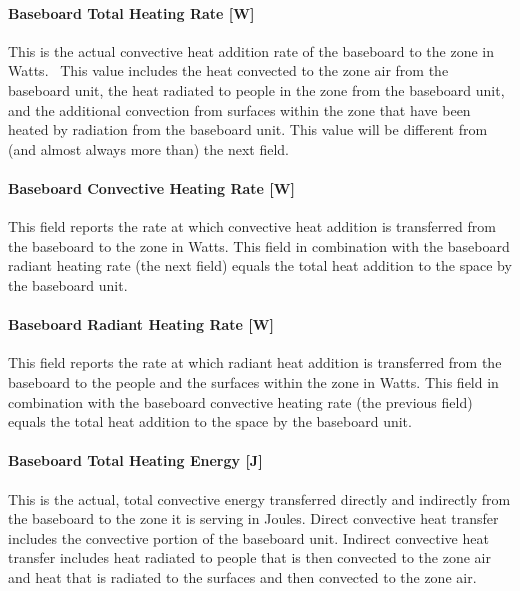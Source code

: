 \paragraph{Baseboard Total Heating Rate {[}W{]}}\label{baseboard-total-heating-rate-w-1}

This is the actual convective heat addition rate of the baseboard to the zone in Watts.~ This value includes the heat convected to the zone air from the baseboard unit, the heat radiated to people in the zone from the baseboard unit, and the additional convection from surfaces within the zone that have been heated by radiation from the baseboard unit. This value will be different from (and almost always more than) the next field.

\paragraph{Baseboard Convective Heating Rate {[}W{]}}\label{baseboard-convective-heating-rate-w-1}

This field reports the rate at which convective heat addition is transferred from the baseboard to the zone in Watts.  This field in combination with the baseboard radiant heating rate (the next field) equals the total heat addition to the space by the baseboard unit.

\paragraph{Baseboard Radiant Heating Rate {[}W{]}}\label{baseboard-radiant-heating-rate-w-1}

This field reports the rate at which radiant heat addition is transferred from the baseboard to the people and the surfaces within the zone in Watts.  This field in combination with the baseboard convective heating rate (the previous field) equals the total heat addition to the space by the baseboard unit.

\paragraph{Baseboard Total Heating Energy {[}J{]}}\label{baseboard-total-heating-energy-j-1}

This is the actual, total convective energy transferred directly and indirectly from the baseboard to the zone it is serving in Joules. Direct convective heat transfer includes the convective portion of the baseboard unit. Indirect convective heat transfer includes heat radiated to people that is then convected to the zone air and heat that is radiated to the surfaces and then convected to the zone air.

